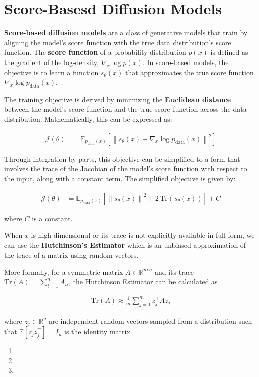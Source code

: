 \section{Score-Basesd Diffusion Models}

\textbf{Score-based diffusion models} are a class of generative models that train by aligning the model's score function with the true data 
distribution's score function. The \textbf{score function} of a probability distribution $p(x)$ is defined as the gradient of the log-density, 
$\nabla_x \log p(x)$. In score-based models, the objective is to learn a function $s_\theta(x)$ that approximates the true score function
$\nabla_x \log p_{\text{data}}(x)$.

The training objective is derived by minimizing the \textbf{Euclidean distance} between the model's score function and the true score function across the 
data distribution. Mathematically, this can be expressed as:

\begin{align}
    \mathcal{J}(\theta) &= \mathbb{E}_{p_{\text{data}}(x)} \left[ \left\| s_\theta(x) - \nabla_x \log p_{\text{data}}(x) \right\|^2 \right]
\end{align}

Through integration by parts, this objective can be simplified to a form that involves the trace of the Jacobian of the model's score function with 
respect to the input, along with a constant term. The simplified objective is given by:

\begin{align}
    \mathcal{J}(\theta) &= \mathbb{E}_{p_{\text{data}}(x)} \left[ \left\| s_\theta(x) \right\|^2 + 2 \, \text{Tr} \left( s_\theta(x) \right) \right] + C
\end{align}

where $C$ is a constant.

When $x$ is high dimensional or its trace is not explicitly available in full form, we can use the \textbf{Hutchinson's Estimator} which is an unbiased 
approximation of the trace of a matrix using random vectors. 

More formally, for a symmetric matrix $A \in \mathbb{R}^{n \text{x} n}$ and its trace $\text{Tr}(A) = \sum_{i=1}^{n} A_{ii}$, the Hutchinson Estimator 
can be calculated as

\begin{align}
    \text{Tr}(A) \approx \frac{1}{m} \sum_{j=1}^{m} z_{j}^{\top} Az_j
\end{align}

where $z_j \in \mathbb{R}^n$ are independent random vectors sampled from a distribution such that $\mathbb{E}[z_jz_j^\top] = I_n$ is the identity  matrix.

\begin{enumerate}[label=(\alph*)]
    \item 

    \item 

    \item 
\end{enumerate}